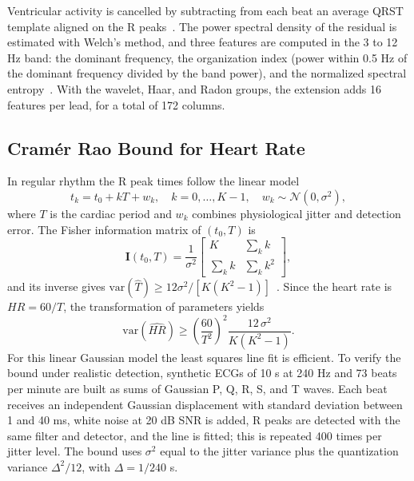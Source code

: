 \documentclass[conference,a4paper]{IEEEtran}
\begin{document}
Ventricular activity is cancelled by subtracting from each beat an average QRST template aligned on the R peaks~\cite{stridh2001}. The power spectral density of the residual is estimated with Welch's method, and three features are computed in the 3 to 12 Hz band: the dominant frequency, the organization index (power within 0.5 Hz of the dominant frequency divided by the band power), and the normalized spectral entropy~\cite{bollmann2006}. With the wavelet, Haar, and Radon groups, the extension adds 16 features per lead, for a total of 172 columns.

\subsection{Cramér Rao Bound for Heart Rate}

In regular rhythm the R peak times follow the linear model
\begin{equation}
t_k = t_0 + kT + w_k, \quad k = 0, \dots, K-1, \quad w_k \sim \mathcal{N}(0, \sigma^2),
\end{equation}
where $T$ is the cardiac period and $w_k$ combines physiological jitter and detection error. The Fisher information matrix of $(t_0, T)$ is
\begin{equation}
\mathbf{I}(t_0, T) = \frac{1}{\sigma^2}\begin{bmatrix} K & \sum_k k \\ \sum_k k & \sum_k k^2 \end{bmatrix},
\end{equation}
and its inverse gives $\mathrm{var}(\hat T) \geq 12\sigma^2 / [K(K^2-1)]$~\cite{kay1993}. Since the heart rate is $HR = 60/T$, the transformation of parameters yields
\begin{equation}
\mathrm{var}(\widehat{HR}) \geq \left(\frac{60}{T^2}\right)^2 \frac{12\,\sigma^2}{K(K^2-1)}.
\label{eq:crlb}
\end{equation}
For this linear Gaussian model the least squares line fit is efficient. To verify the bound under realistic detection, synthetic ECGs of 10 s at 240 Hz and 73 beats per minute are built as sums of Gaussian P, Q, R, S, and T waves. Each beat receives an independent Gaussian displacement with standard deviation between 1 and 40 ms, white noise at 20 dB SNR is added, R peaks are detected with the same filter and detector, and the line is fitted; this is repeated 400 times per jitter level. The bound uses $\sigma^2$ equal to the jitter variance plus the quantization variance $\Delta^2/12$, with $\Delta = 1/240$ s.
\end{document}
